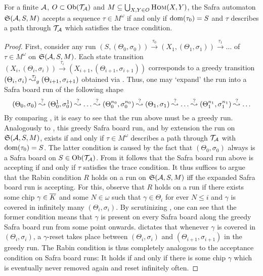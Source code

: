 \begin{lemma}\label{lem:safra-automaton-correct}
  For a finite $\mathcal{A}$, $O \subset \mathrm{Ob}(\mathcal{T}_{\mathcal{A}})$ and $M \subseteq \bigcup_{X, Y
    \in O} \textsc{Hom}(X, Y)$, the Safra automaton $\mathfrak{S}(\mathcal{A}, S, M)$ accepts a sequence
  $\tau \in M^\omega$ if and only if $\mathrm{dom}(\tau_0) = S$ and $\tau$ describes a
  path through $\mathcal{T}_{\mathcal{A}}$ which satisfies the trace condition.
\end{lemma}
\begin{proof}
  First, consider any run $(S, (\Theta_0, \sigma_0)) \xrightarrow{\tau_0} (X_1,
  (\Theta_1, \sigma_1)) \xrightarrow{\tau_1} \ldots$ of $\tau \in M^\omega$ on
  $\mathfrak{S}(\mathcal{A}, S, M)$. Each state
  transition $(X_i, (\Theta_i, \sigma_i)) \xrightarrow{\tau_i} (X_{i + 1},
  (\Theta_{i + 1}, \sigma_{i + 1}))$ corresponds to a greedy transition
  $(\Theta_i, \sigma_i) \stackrel{\tau_i}{\leadsto_g} (\Theta_{i + 1}, \sigma_{i + 1})$
  obtained via . Thus, one may `expand' the run into a
  Safra board run of the following shape
  \[
    (\Theta_0, \sigma_0) \stackrel{?}{\leadsto} (\Theta_0^1, \sigma_0^1) \stackrel{?}{\leadsto} \ldots
    \stackrel{?}{\leadsto} (\Theta_0^{n_0}, \sigma_0^{n_0}) \stackrel{?}{\leadsto}
    (\Theta_1, \sigma_1) \stackrel{?}{\leadsto} \ldots
    \stackrel{?}{\leadsto} (\Theta_1^{n_1}, \sigma_1^{n_1}) \stackrel{?}{\leadsto} \ldots
  \]
  By comparing , it is easy to see that the run
  above must be a greedy run. Analogously to , this greedy
  Safra board run, and by extension the run on $\mathfrak{S}(\mathcal{A}, S, M)$, exists if and
  only if $\tau \in M^\omega$ describes a path through $\mathcal{T}_{\mathcal{A}}$ with
  $\mathrm{dom}(\tau_0) = S$. The latter condition is caused by the fact that
  $(\Theta_0, \sigma_0)$ always is a Safra board on $S \in \mathrm{Ob}(\mathcal{T}_{\mathcal{A}})$. From
   it follows that the Safra board run above
  is accepting if and only if $\tau$ satisfies the trace condition. It thus
  suffices to argue that the Rabin condition $R$ holds on a run on $\mathfrak{S}(\mathcal{A}, S,
  M)$ iff the expanded Safra board run is accepting. For this, observe that $R$
  holds on a run if there exists some chip $\gamma \in \overline{K}$ and some 
  $N \in \omega$ such that $\gamma \in \Theta_i$ for ever $N \leq i$ and
  $\gamma$ is covered in infinitely many $(\Theta_i, \sigma_i)$. By scrutinizing
  , one can see that the former condition means that
  $\gamma$ is present on every Safra board along the greedy Safra board run from
  some point onwards.  dictates that whenever $\gamma$ is
  covered in $(\Theta_i, \sigma_i)$, a $\gamma$-reset takes place between
  $(\Theta_i, \sigma_i)$ and $(\Theta_{i + 1}, \sigma_{i + 1})$ in the greedy
  run. The Rabin condition is thus completely analogous to the acceptance
  condition on Safra board runs: It holds if and only if there is some chip
  $\gamma$ which is eventually never removed again and reset infinitely often.
\end{proof}

